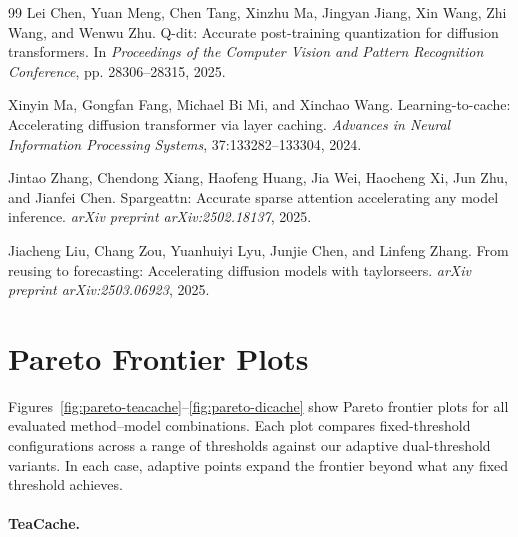 \documentclass{article}
\begin{document}
\begin{thebibliography}{99}
Lei Chen, Yuan Meng, Chen Tang, Xinzhu Ma, Jingyan Jiang, Xin Wang, Zhi Wang, and Wenwu Zhu.
\newblock Q-dit: Accurate post-training quantization for diffusion transformers.
\newblock In \textit{Proceedings of the Computer Vision and Pattern Recognition Conference}, pp. 28306--28315, 2025.

Xinyin Ma, Gongfan Fang, Michael Bi Mi, and Xinchao Wang.
\newblock Learning-to-cache: Accelerating diffusion transformer via layer caching.
\newblock \textit{Advances in Neural Information Processing Systems}, 37:133282--133304, 2024.

Jintao Zhang, Chendong Xiang, Haofeng Huang, Jia Wei, Haocheng Xi, Jun Zhu, and Jianfei Chen.
\newblock Spargeattn: Accurate sparse attention accelerating any model inference.
\newblock \textit{arXiv preprint arXiv:2502.18137}, 2025.

Jiacheng Liu, Chang Zou, Yuanhuiyi Lyu, Junjie Chen, and Linfeng Zhang.
\newblock From reusing to forecasting: Accelerating diffusion models with taylorseers.
\newblock \textit{arXiv preprint arXiv:2503.06923}, 2025.



\end{thebibliography}                                                                    


\appendix

\section{Pareto Frontier Plots}
\label{sec:appendix-pareto}

Figures~\ref{fig:pareto-teacache}--\ref{fig:pareto-dicache} show Pareto frontier plots for all evaluated method--model combinations. Each plot compares fixed-threshold configurations across a range of thresholds against our adaptive dual-threshold variants. In each case, adaptive points expand the frontier beyond what any fixed threshold achieves.

\paragraph{TeaCache.}
\end{document}

